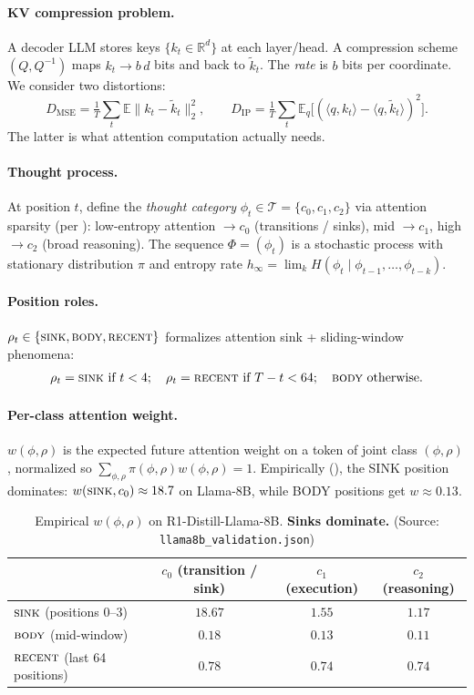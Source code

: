 \documentclass[11pt]{article}
\theoremstyle{definition}
\newcommand{\R}{\mathbb{R}}
\newcommand{\E}{\mathbb{E}}
\newcommand{\hinf}{h_\infty}
\newcommand{\sink}{\textsc{sink}}
\newcommand{\body}{\textsc{body}}
\newcommand{\recent}{\textsc{recent}}
\begin{document}
\paragraph{KV compression problem.}
A decoder LLM stores keys $\{k_t \in \R^d\}$ at each layer/head. A compression scheme $(Q, Q^{-1})$ maps $k_t \to b\,d$ bits and back to $\tilde k_t$. The \emph{rate} is $b$ bits per coordinate. We consider two distortions:
\[
D_{\text{MSE}} = \tfrac{1}{T}\textstyle\sum_t \E\|k_t - \tilde k_t\|_2^2, \qquad
D_{\text{IP}} = \tfrac{1}{T}\textstyle\sum_t \E_q\bigl[(\langle q, k_t\rangle - \langle q, \tilde k_t\rangle)^2\bigr].
\]
The latter is what attention computation actually needs.

\paragraph{Thought process.}
At position $t$, define the \emph{thought category} $\phi_t \in \mathcal{T} = \{c_0, c_1, c_2\}$ via attention sparsity (per \citet{thinkv}): low-entropy attention $\to c_0$ (transitions / sinks), mid $\to c_1$, high $\to c_2$ (broad reasoning). The sequence $\Phi = (\phi_t)$ is a stochastic process with stationary distribution $\pi$ and entropy rate
$\hinf = \lim_{k} H(\phi_t \mid \phi_{t-1}, \ldots, \phi_{t-k})$.

\paragraph{Position roles.}
$\rho_t \in \{\sink, \body, \recent\}$ formalizes attention sink \citep{streamingllm} + sliding-window phenomena:
\[
\rho_t = \sink \text{ if } t<4; \quad \rho_t = \recent \text{ if } T-t<64; \quad \body \text{ otherwise.}
\]

\paragraph{Per-class attention weight.}
$w(\phi, \rho)$ is the expected future attention weight on a token of joint class $(\phi, \rho)$, normalized so $\sum_{\phi,\rho} \pi(\phi,\rho) w(\phi,\rho) = 1$. Empirically (), the SINK position dominates: $w(\sink, c_0) \approx 18.7$ on Llama-8B, while BODY positions get $w \approx 0.13$.

\begin{table}[t]
\centering
\caption{Empirical $w(\phi, \rho)$ on R1-Distill-Llama-8B. \textbf{Sinks dominate.} (Source: \texttt{llama8b\_validation.json})}
\label{tab:w-table}
\begin{tabular}{lccc}
\toprule
& \textbf{$c_0$ (transition / sink)} & \textbf{$c_1$ (execution)} & \textbf{$c_2$ (reasoning)} \\
\midrule
\textbf{$\sink$} (positions 0--3) & $\boldsymbol{18.67}$ & $1.55$ & $1.17$ \\
\textbf{$\body$} (mid-window) & $0.18$ & $0.13$ & $0.11$ \\
\textbf{$\recent$} (last 64 positions) & $0.78$ & $0.74$ & $0.74$ \\
\bottomrule
\end{tabular}
\end{table}
\end{document}
